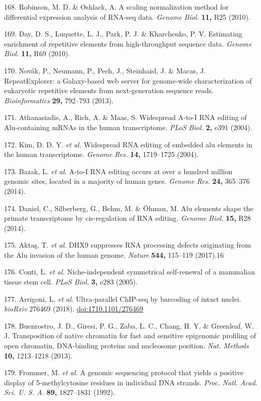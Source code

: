 \documentclass[11pt,twoside]{MPIthesis}
\theoremstyle{definition}
\theoremstyle{definition}
\theoremstyle{definition}
\theoremstyle{remark}
\begin{document}
168. Robinson, M. D. \& Oshlack, A. A scaling normalization method for
differential expression analysis of RNA-seq data. \emph{Genome Biol.}
\textbf{11,} R25 (2010).

169. Day, D. S., Luquette, L. J., Park, P. J. \& Kharchenko, P. V.
Estimating enrichment of repetitive elements from high-throughput
sequence data. \emph{Genome Biol.} \textbf{11,} R69 (2010).

170. Novák, P., Neumann, P., Pech, J., Steinhaisl, J. \& Macas, J.
RepeatExplorer: a Galaxy-based web server for genome-wide
characterization of eukaryotic repetitive elements from next-generation
sequence reads. \emph{Bioinformatics} \textbf{29,} 792--793 (2013).

171. Athanasiadis, A., Rich, A. \& Maas, S. Widespread A-to-I RNA
editing of Alu-containing mRNAs in the human transcriptome. \emph{PLoS
Biol.} \textbf{2,} e391 (2004).

172. Kim, D. D. Y. \emph{et al.} Widespread RNA editing of embedded alu
elements in the human transcriptome. \emph{Genome Res.} \textbf{14,}
1719--1725 (2004).

173. Bazak, L. \emph{et al.} A-to-I RNA editing occurs at over a hundred
million genomic sites, located in a majority of human genes.
\emph{Genome Res.} \textbf{24,} 365--376 (2014).

174. Daniel, C., Silberberg, G., Behm, M. \& Öhman, M. Alu elements
shape the primate transcriptome by cis-regulation of RNA editing.
\emph{Genome Biol.} \textbf{15,} R28 (2014).

175. Aktaş, T. \emph{et al.} DHX9 suppresses RNA processing defects
originating from the Alu invasion of the human genome. \emph{Nature}
\textbf{544,} 115--119 (2017).16

176. Conti, L. \emph{et al.} Niche-independent symmetrical self-renewal
of a mammalian tissue stem cell. \emph{PLoS Biol.} \textbf{3,} e283
(2005).

177. Arrigoni, L. \emph{et al.} Ultra-parallel ChIP-seq by barcoding of
intact nuclei. \emph{bioRxiv} 276469 (2018). \url{doi:1710.1101/276469}

178. Buenrostro, J. D., Giresi, P. G., Zaba, L. C., Chang, H. Y. \&
Greenleaf, W. J. Transposition of native chromatin for fast and
sensitive epigenomic profiling of open chromatin, DNA-binding proteins
and nucleosome position. \emph{Nat. Methods} \textbf{10,} 1213--1218
(2013).

179. Frommer, M. \emph{et al.} A genomic sequencing protocol that yields
a positive display of 5-methylcytosine residues in individual DNA
strands. \emph{Proc. Natl. Acad. Sci. U. S. A.} \textbf{89,} 1827--1831
(1992).
\end{document}
